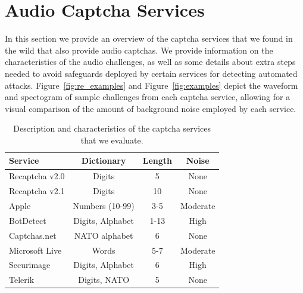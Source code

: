 \section{Audio Captcha Services}
\label{sec:services}

In this section we provide an overview of the captcha services that we found in the wild
that also provide audio captchas. We provide information on the characteristics of the audio challenges, as
well as some details about extra steps needed to avoid safeguards deployed by certain services for 
detecting automated attacks. Figure~\ref{fig:re_examples} and Figure~\ref{fig:examples} depict the waveform
and spectogram of sample challenges from each captcha service, allowing for a visual comparison
of the amount of background noise employed by each service.


\begin{table}[t]
\centering
\caption{Description and characteristics of the captcha services that we evaluate.}
\begin{tabular}{lccc}
\toprule
\textbf{Service}& \textbf{Dictionary}& \textbf{Length} & \textbf{Noise} \\
\hline
Recaptcha v2.0 & Digits & 5 & None \\
\rowcolor{Gray}
Recaptcha v2.1 & Digits & 10 & None \\
Apple & Numbers (10-99) & 3-5 & Moderate\\
\rowcolor{Gray}
BotDetect & Digits, Alphabet & 1-13 & High \\
Captchas.net & NATO alphabet & 6 & None \\
\rowcolor{Gray}
Microsoft Live & Words & 5-7 & Moderate \\
Securimage & Digits, Alphabet & 6 & High \\
\rowcolor{Gray}
Telerik & Digits, NATO & 5 & None \\
\bottomrule
\end{tabular}
\label{tab:services}
\end{table}

